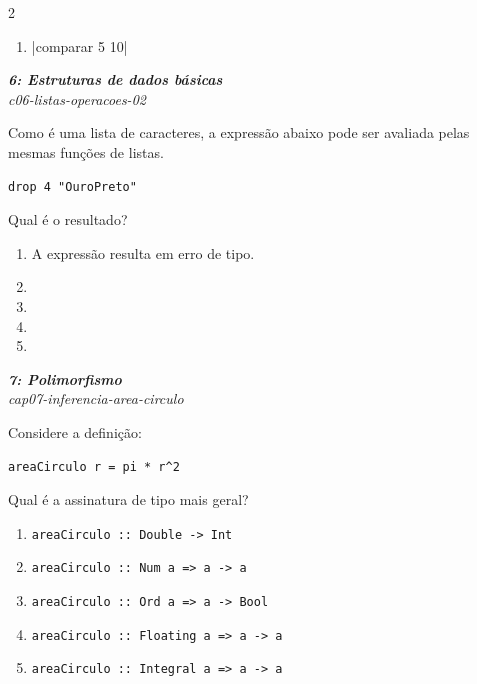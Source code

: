 \documentclass[a4paper,10pt,brazil]{article}
\begin{document}
\begin{multicols}{2}
\begin{enumerate}
  \item \haskellinline|comparar 5 10|


\end{enumerate}

\begin{flushright}
  \footnotesize
  \textit{\textbf{6: Estruturas de dados básicas}}\\
  \textit{c06-listas-operacoes-02}\\

\end{flushright}
Como  é uma lista de caracteres, a expressão abaixo pode ser avaliada pelas mesmas funções de listas.
\begin{verbatim}
drop 4 "OuroPreto"
\end{verbatim}
Qual é o resultado?

\begin{enumerate}
  \item A expressão resulta em erro de tipo.

  \item {}

  \item {}

  \item {}

  \item {}


\end{enumerate}

\begin{flushright}
  \footnotesize
  \textit{\textbf{7: Polimorfismo}}\\
  \textit{cap07-inferencia-area-circulo}\\

\end{flushright}
Considere a definição:

\begin{verbatim}
areaCirculo r = pi * r^2
\end{verbatim}

Qual é a assinatura de tipo mais geral?

\begin{enumerate}
  \item \texttt{areaCirculo :: Double -> Int}
  \item \texttt{areaCirculo :: Num a => a -> a}
  \item \texttt{areaCirculo :: Ord a => a -> Bool}
  \item \texttt{areaCirculo :: Floating a => a -> a}
  \item \texttt{areaCirculo :: Integral a => a -> a}


\end{enumerate}
\end{multicols}
\end{document}
